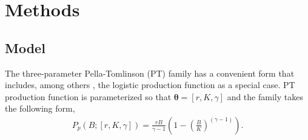 %

%
\section{Methods \label{meth}}

\subsection{Model}

%
The three-parameter Pella-Tomlinson (PT) family has a convenient form that includes, among
others \cite{fox_jr_exponential_1970,rankin_alternative_2015}, the
logistic production function as a special case. %
PT production function is parameterized so that $\bm{\theta} = [r, K, \gamma]$
and the family takes the following form,
\begin{align}
P_{p}(B; [r, K, \gamma]) = \frac{r B}{\gamma-1} \left(1-\left(\frac{B}{K}\right)^{(\gamma-1)}\right). \label{pt}
\end{align}


